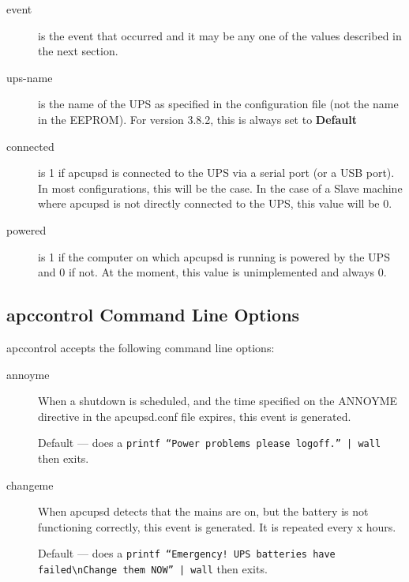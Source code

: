 {{{{{{\begin{description}
\item [event]
   is the event that occurred and it may be any one of the values described in
the next section.  

\item [ups-name]
   is the name of the UPS as specified in the configuration file (not the name in
the EEPROM). For version 3.8.2, this is always set to {\bf Default}  

\item [connected]
   is 1 if apcupsd is connected to the UPS via a serial port (or a USB port). In
most configurations, this will be the case. In the case of a Slave machine
where apcupsd is not directly connected to the UPS, this value will be 0.  

\item [powered]
   is 1 if the computer on which apcupsd is running is powered by the UPS and 0
if not.  At the moment, this value is unimplemented and always 0. 
\end{description}

\label{apccontrol-Command-Line-Options}

\subsection*{apccontrol Command Line Options}

apccontrol accepts the following command line options:  

\begin{description}

\item [annoyme]
   When a shutdown is scheduled, and the time specified on the ANNOYME directive
in the apcupsd.conf file expires, this event is generated.  

Default {---} does a {\tt printf ``Power problems please logoff.'' | wall}
then exits.  

\item [changeme]
   When apcupsd detects that the mains are on, but the battery is not functioning
correctly, this event is generated. It is repeated every x hours.  

Default {---} does a {\tt printf ``Emergency! UPS batteries have
failed\textbackslash{}nChange them NOW'' | wall} then exits.  


\end{description}}}}}}}
